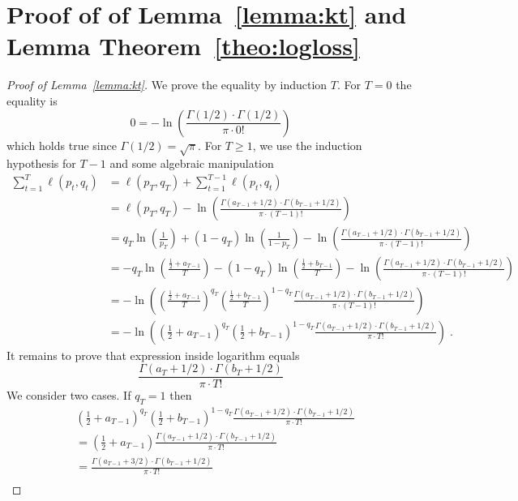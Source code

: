 \section{Proof of of Lemma~\ref{lemma:kt} and Lemma Theorem~\ref{theo:logloss}}

\begin{proof}[Proof of Lemma~\ref{lemma:kt}]
We prove the equality by induction $T$. For $T=0$ the equality is
$$
0 = - \ln \left( \frac{\Gamma(1/2) \cdot \Gamma(1/2)}{\pi \cdot 0!} \right)
$$
which holds true since $\Gamma(1/2) = \sqrt{\pi}$.
For $T \ge 1$, we use the induction hypothesis for $T-1$ and some algebraic manipulation
\begin{align*}
\sum_{t=1}^T \ell(p_t, q_t)
& = \ell(p_T, q_T) + \sum_{t=1}^{T-1} \ell(p_t, q_t) \\
& = \ell(p_T, q_T) - \ln \left( \frac{\Gamma(a_{T-1} + 1/2) \cdot \Gamma(b_{T-1} + 1/2)}{\pi \cdot (T-1)!} \right) \\
& = q_T \ln\left( \frac{1}{p_T}\right) + (1-q_T) \ln  \left( \frac{1}{1 - p_T} \right) - \ln \left( \frac{\Gamma(a_{T-1} + 1/2) \cdot \Gamma(b_{T-1} + 1/2)}{\pi \cdot (T-1)!} \right) \\
& = - q_T \ln\left( \frac{\frac{1}{2} + a_{T-1}}{T} \right) - (1-q_T) \ln\left( \frac{\frac{1}{2} + b_{T-1}}{T} \right) - \ln \left( \frac{\Gamma(a_{T-1} + 1/2) \cdot \Gamma(b_{T-1} + 1/2)}{\pi \cdot (T-1)!} \right) \\
& = - \ln\left( \left( \frac{\frac{1}{2} + a_{T-1}}{T} \right)^{q_T} \left( \frac{\frac{1}{2} + b_{T-1}}{T} \right)^{1-q_T} \frac{\Gamma(a_{T-1} + 1/2) \cdot \Gamma(b_{T-1} + 1/2)}{\pi \cdot (T-1)!} \right) \\
& = - \ln\left( \left( \frac{1}{2} + a_{T-1} \right)^{q_T} \left( \frac{1}{2} + b_{T-1} \right)^{1-q_T} \frac{\Gamma(a_{T-1} + 1/2) \cdot \Gamma(b_{T-1} + 1/2)}{\pi \cdot T!}  \right) \; .
\end{align*}
It remains to prove that expression inside logarithm equals
$$
\frac{\Gamma(a_{T} + 1/2) \cdot \Gamma(b_T + 1/2)}{\pi \cdot T!}
$$
We consider two cases. If $q_T = 1$ then
\begin{align*}
& \left( \frac{1}{2} + a_{T-1} \right)^{q_T} \left( \frac{1}{2} + b_{T-1} \right)^{1-q_T} \frac{\Gamma(a_{T-1} + 1/2) \cdot \Gamma(b_{T-1} + 1/2)}{\pi \cdot T!} \\
& = \left( \frac{1}{2} + a_{T-1} \right) \frac{\Gamma(a_{T-1} + 1/2) \cdot \Gamma(b_{T-1} + 1/2)}{\pi \cdot T!} \\
& = \frac{\Gamma(a_{T-1} + 3/2) \cdot \Gamma(b_{T-1} + 1/2)}{\pi \cdot T!} \\

\end{align*}
\end{proof}
